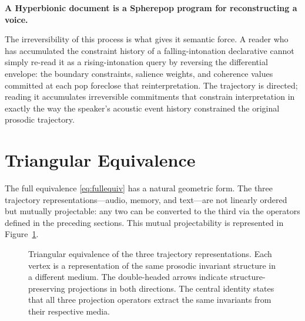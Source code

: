 \documentclass[12pt, a4paper]{article}
\newcommand{\hyperemph}[1]{\textbf{\large #1}}
\begin{document}
\begin{center}
\hyperemph{A Hyperbionic document is a Spherepop program for reconstructing a voice.}
\end{center}

The irreversibility of this process is what gives it semantic force. A reader who has accumulated the constraint history of a falling-intonation declarative cannot simply re-read it as a rising-intonation query by reversing the differential envelope: the boundary constraints, salience weights, and coherence values committed at each pop foreclose that reinterpretation. The trajectory is directed; reading it accumulates irreversible commitments that constrain interpretation in exactly the way the speaker's acoustic event history constrained the original prosodic trajectory.


\section{Triangular Equivalence}

The full equivalence \eqref{eq:fullequiv} has a natural geometric form. The three trajectory representations---audio, memory, and text---are not linearly ordered but mutually projectable: any two can be converted to the third via the operators defined in the preceding sections. This mutual projectability is represented in Figure~\ref{fig:triangle}.

\begin{figure}[h]
\centering
{}
\caption{Triangular equivalence of the three trajectory representations. Each vertex is a representation of the same prosodic invariant structure in a different medium. The double-headed arrows indicate structure-preserving projections in both directions. The central identity states that all three projection operators extract the same invariants from their respective media.}
\label{fig:triangle}
\end{figure}
\end{document}
